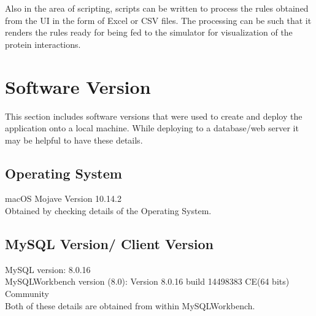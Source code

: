 \documentclass[msc,deptreport,ai]{infthesis}      %
\begin{document}
Also in the area of scripting, scripts can be written to process the rules obtained from the UI in the form of Excel or CSV files. The processing can be such that it renders the rules ready for being fed to the simulator for visualization of the protein interactions.









 \appendix
% 
\chapter{Software Version}
% 
This section includes software versions that were used to create and deploy the application onto a local machine. While deploying to a database/web server it may be helpful to have these details.
 \section{Operating System}
 macOS Mojave Version 10.14.2\\
 Obtained by checking details of the Operating System.
 \section{MySQL Version/ Client Version}
 MySQL version: 8.0.16\\
 MySQLWorkbench version (8.0): Version 8.0.16 build 14498383 CE(64 bits) Community\\
 Both of these details are obtained from within MySQLWorkbench.
\end{document}
